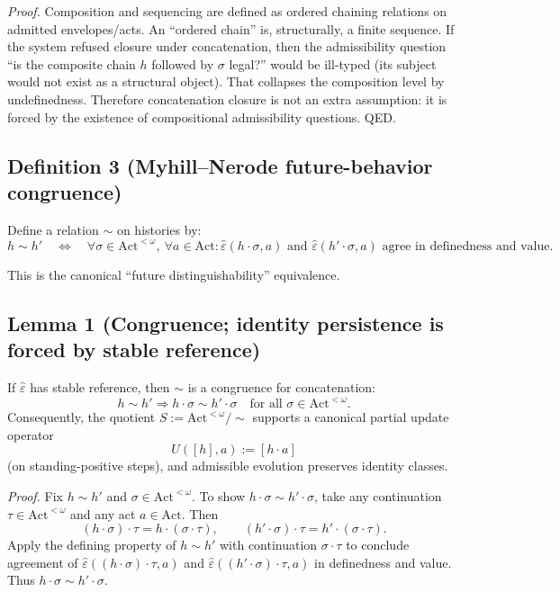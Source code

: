 \documentclass[12pt]{article}
\theoremstyle{plain}
\begin{document}
\textit{Proof.} Composition and sequencing are defined as ordered chaining relations on admitted envelopes/acts. An ``ordered chain'' is, structurally, a finite sequence. If the system refused closure under concatenation, then the admissibility question ``is the composite chain $h$ followed by $\sigma$ legal?'' would be ill-typed (its subject would not exist as a structural object). That collapses the composition level by undefinedness. Therefore concatenation closure is not an extra assumption: it is forced by the existence of compositional admissibility questions. QED.

\subsection{Definition 3 (Myhill--Nerode future-behavior congruence)}

Define a relation $\sim$ on histories by:
\[
 h\sim h' \quad\Longleftrightarrow\quad \forall \sigma\in \mathrm{Act}^{<\omega},\ \forall a\in\mathrm{Act}:
\widehat\varepsilon(h\cdot\sigma,a)\text{ and }\widehat\varepsilon(h'\cdot\sigma,a)\text{ agree in definedness and value.}
\]

This is the canonical ``future distinguishability'' equivalence.

\subsection{Lemma 1 (Congruence; identity persistence is forced by stable reference)}

If $\widehat\varepsilon$ has stable reference, then $\sim$ is a congruence for concatenation:
\[
 h\sim h' \Longrightarrow h\cdot \sigma \sim h'\cdot\sigma \quad \text{for all }\sigma\in\mathrm{Act}^{<\omega}.
\]
Consequently, the quotient $S:=\mathrm{Act}^{<\omega}/\sim$ supports a canonical partial update operator
\[
U([h],a):=[h\cdot a]
\]
(on standing-positive steps), and admissible evolution preserves identity classes.

\textit{Proof.} Fix $h\sim h'$ and $\sigma\in\mathrm{Act}^{<\omega}$. To show $h\cdot\sigma\sim h'\cdot\sigma$, take any continuation $\tau\in\mathrm{Act}^{<\omega}$ and any act $a\in\mathrm{Act}$. Then
\[(h\cdot\sigma)\cdot\tau = h\cdot(\sigma\cdot\tau),\qquad (h'\cdot\sigma)\cdot\tau = h'\cdot(\sigma\cdot\tau).
\]
Apply the defining property of $h\sim h'$ with continuation $\sigma\cdot\tau$ to conclude agreement of
$\widehat\varepsilon((h\cdot\sigma)\cdot\tau,a)$ and $\widehat\varepsilon((h'\cdot\sigma)\cdot\tau,a)$ in definedness and value. Thus $h\cdot\sigma\sim h'\cdot\sigma$.
\end{document}
